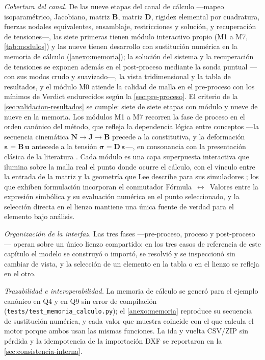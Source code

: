 \emph{Cobertura del canal.} De las nueve etapas del canal de cálculo —mapeo isoparamétrico, Jacobiano, matriz $\bm{B}$, matriz $\bm{D}$, rigidez elemental por cuadratura, fuerzas nodales equivalentes, ensamblaje, restricciones y solución, y recuperación de tensiones—, las siete primeras tienen módulo interactivo propio (M1 a M7, \autoref{tab:modulos}) y las nueve tienen desarrollo con sustitución numérica en la memoria de cálculo (\autoref{anexo:memoria}); la solución del sistema y la recuperación de tensiones se exponen además en el post-proceso mediante la sonda puntual —con sus modos crudo y suavizado—, la vista tridimensional y la tabla de resultados, y el módulo M0 atiende la calidad de malla en el pre-proceso con los mínimos de Verdict \autocite[pp.~51, 57]{stimpson2007verdict} endurecidos según la \autoref{sec:pre-proceso}. El criterio de la \autoref{sec:validacion-resultados} se cumple: siete de siete etapas con módulo y nueve de nueve en la memoria. Los módulos M1 a M7 recorren la fase de proceso en el orden canónico del método, que refleja la dependencia lógica entre conceptos —la secuencia cinemática $\bm{N}\rightarrow\bm{J}\rightarrow\bm{B}$ precede a la constitutiva, y la deformación $\bm{\varepsilon} = \bm{B}\,\bm{u}$ antecede a la tensión $\bm{\sigma} = \bm{D}\,\bm{\varepsilon}$—, en consonancia con la presentación clásica de la literatura \autocite{bathe2014fem,cook2002concepts}. Cada módulo es una capa superpuesta interactiva que ilumina sobre la malla real el punto donde ocurre el cálculo, con el vínculo entre la entrada de la matriz y la geometría que Lee describe para sus simuladores \autocite[pp.~163, 166]{lee2015interactive}; los que exhiben formulación incorporan el conmutador Fórmula~$\leftrightarrow$~Valores entre la expresión simbólica y su evaluación numérica en el punto seleccionado, y la selección directa en el lienzo mantiene una única fuente de verdad para el elemento bajo análisis.

\emph{Organización de la interfaz.} Las tres fases —pre-proceso, proceso y post-proceso— operan sobre un único lienzo compartido: en los tres casos de referencia de este capítulo el modelo se construyó o importó, se resolvió y se inspeccionó sin cambiar de vista, y la selección de un elemento en la tabla o en el lienzo se refleja en el otro.

\emph{Trazabilidad e interoperabilidad.} La memoria de cálculo se generó para el ejemplo canónico en Q4 y en Q9 sin error de compilación (\texttt{tests/test\_memoria\_calculo.py}); el \autoref{anexo:memoria} reproduce su secuencia de sustitución numérica, y cada valor que muestra coincide con el que calcula el motor porque ambos usan las mismas funciones. La ida y vuelta CSV/ZIP sin pérdida y la idempotencia de la importación DXF se reportaron en la \autoref{sec:consistencia-interna}.

